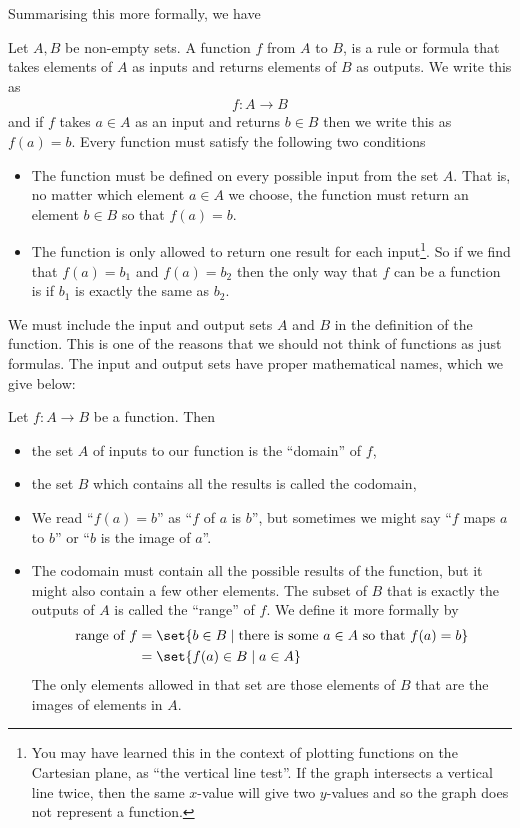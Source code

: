 Summarising this more formally, we have
\begin{defn}
\label{def function}
 Let $A, B$ be non-empty sets. A function $f$ from $A$ to $B$, is a rule or
formula that takes elements of $A$ as inputs and returns elements of $B$ as
outputs. We write this as
\begin{align*}
  f: A \to B
\end{align*}
and if $f$ takes $a \in A$ as an input and returns $b\in B$ then we write this
as $f(a) = b$. Every function must satisfy the following two conditions
\begin{itemize}
\item The function must be defined on every possible input from the set $A$.
That is, no matter which element $a \in A$ we choose, the function must return
an element $b \in B$ so that $f(a)=b$.

\item The function is only allowed to return one result for each
input\footnote{You may have learned this in the context of plotting functions on
the Cartesian plane, as ``the vertical line test''. If the graph intersects a
vertical line twice, then the same $x$-value will give two $y$-values and so
the graph does not represent a function.}. So if we find that $f(a)=b_1$ and
$f(a)=b_2$ then the only way that $f$ can be a function is if $b_1$ is exactly
the same as $b_2$.
\end{itemize}
\end{defn}
We must include the input and output sets $A$ and $B$ in the definition of the
function. This is one of the reasons that we should not think of
functions as just formulas. The input and output sets have proper mathematical
names, which we give below:
\begin{defn}\label{def_0_4_1}
Let $f:A \to B$ be a function. Then
\begin{itemize}
\item the set $A$ of inputs to our function is the ``domain'' of $f$,
\item the set $B$ which contains all the results is called the codomain,
\item We read ``$f(a) = b$'' as ``$f$ of $a$ is $b$'', but sometimes we might
say ``$f$ maps $a$ to $b$'' or ``$b$ is the image of $a$''.

\item The codomain must contain all the possible results of the function, but
it might also contain a few other elements. The subset of $B$ that is
exactly the outputs of $A$ is called the ``range'' of $f$. We define it more
formally by
\begin{align*}
	\text{range of } f &= \set{b \in B \;|\; \text{there is some } a \in
A \text{ so that } f(a) = b} \\
  &= \set{f(a) \in B \;|\; a \in A}
\end{align*}
  The only elements allowed in that set are those elements of $B$ that are the
images of elements in $A$.
\end{itemize}
\end{defn}


